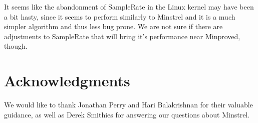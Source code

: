 \documentclass[twocolumn,10pt]{article}
\begin{document}
It seems like the abandonment of SampleRate in the Linux kernel may
have been a bit hasty, since it seems to perform similarly to Minstrel
and it is a much simpler algorithm and thus less bug prone.  We are
not sure if there are adjustments to SampleRate that will bring it's
performance near Minproved, though.

\section{Acknowledgments}

We would like to thank Jonathan Perry and Hari Balakrishnan for their
valuable guidance, as well as Derek Smithies for answering our
questions about Minstrel.


{\footnotesize 
}
\end{document}

